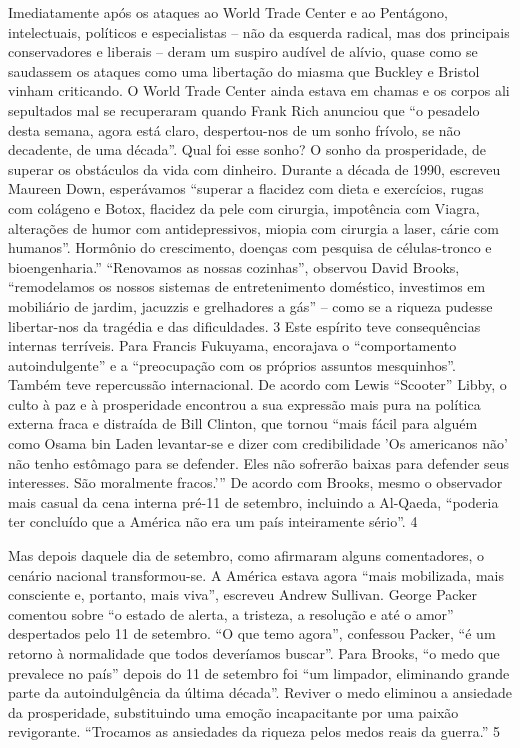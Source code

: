\par
 
Imediatamente após os ataques ao World Trade Center e ao Pentágono, intelectuais, políticos e especialistas – não da esquerda radical, mas dos principais conservadores e liberais – deram um suspiro audível de alívio, quase como se saudassem os ataques como uma libertação do miasma que Buckley e Bristol vinham criticando. O World Trade Center ainda estava em chamas e os corpos ali sepultados mal se recuperaram quando Frank Rich anunciou que “o pesadelo desta semana, agora está claro, despertou-nos de um sonho frívolo, se não decadente, de uma década”. Qual foi esse sonho? O sonho da prosperidade, de superar os obstáculos da vida com dinheiro. Durante a década de 1990, escreveu Maureen Down, esperávamos “superar a flacidez com dieta e exercícios, rugas com colágeno e Botox, flacidez da pele com cirurgia, impotência com Viagra, alterações de humor com antidepressivos, miopia com cirurgia a laser, cárie com humanos”. Hormônio do crescimento, doenças com pesquisa de células-tronco e bioengenharia.” “Renovamos as nossas cozinhas”, observou David Brooks, “remodelamos os nossos sistemas de entretenimento doméstico, investimos em mobiliário de jardim, jacuzzis e grelhadores a gás” – como se a riqueza pudesse libertar-nos da tragédia e das dificuldades.
 {\color{blue} 3}  
Este espírito teve consequências internas terríveis. Para Francis Fukuyama, encorajava o “comportamento autoindulgente” e a “preocupação com os próprios assuntos mesquinhos”. Também teve repercussão internacional. De acordo com Lewis “Scooter” Libby, o culto à paz e à prosperidade encontrou a sua expressão mais pura na política externa fraca e distraída de Bill Clinton, que tornou “mais fácil para alguém como Osama bin Laden levantar-se e dizer com credibilidade 'Os americanos não' não tenho estômago para se defender. Eles não sofrerão baixas para defender seus interesses. São moralmente fracos.’” De ​​acordo com Brooks, mesmo o observador mais casual da cena interna pré-11 de setembro, incluindo a Al-Qaeda, “poderia ter concluído que a América não era um país inteiramente sério”.
 {\color{blue} 4}  

 
\par
 
Mas depois daquele dia de setembro, como afirmaram alguns comentadores, o cenário nacional transformou-se. A América estava agora “mais mobilizada, mais consciente e, portanto, mais viva”, escreveu Andrew Sullivan. George Packer comentou sobre “o estado de alerta, a tristeza, a resolução e até o amor” despertados pelo 11 de setembro. “O que temo agora”, confessou Packer, “é um retorno à normalidade que todos deveríamos buscar”. Para Brooks, “o medo que prevalece no país” depois do 11 de setembro foi “um limpador, eliminando grande parte da autoindulgência da última década”. Reviver o medo eliminou a ansiedade da prosperidade, substituindo uma emoção incapacitante por uma paixão revigorante. “Trocamos as ansiedades da riqueza pelos medos reais da guerra.” 5
 
